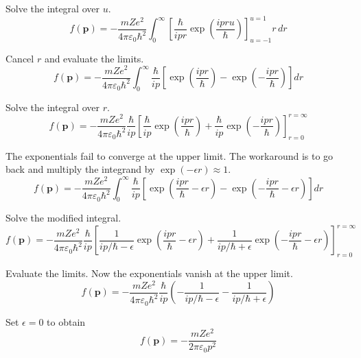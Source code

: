 Solve the integral over $u$.
\begin{equation*}
f(\mathbf p)=-\frac{mZe^2}{4\pi\varepsilon_0\hbar^2}
\int_0^\infty
\left[\frac{\hbar}{ipr}\exp\left(\frac{ipru}{\hbar}\right)\right]_{u=-1}^{u=1}
r\,dr
\end{equation*}

Cancel $r$ and evaluate the limits.
\begin{equation*}
f(\mathbf p)=-\frac{mZe^2}{4\pi\varepsilon_0\hbar^2}
\int_0^\infty
\frac{\hbar}{ip}
\left[\exp\left(\frac{ipr}{\hbar}\right)-\exp\left(-\frac{ipr}{\hbar}\right)\right]
dr
\end{equation*}

Solve the integral over $r$.
\begin{equation*}
f(\mathbf p)
=-\frac{mZe^2}{4\pi\varepsilon_0\hbar^2}\frac{\hbar}{ip}
\left[
\frac{\hbar}{ip}
\exp\left(\frac{ipr}{\hbar}\right)
+\frac{\hbar}{ip}
\exp\left(-\frac{ipr}{\hbar}\right)
\right]_{r=0}^{r=\infty}
\end{equation*}

The exponentials fail to converge at the upper limit.
The workaround is to go back and multiply the integrand by $\exp(-\epsilon r)\approx1$.
\begin{equation*}
f(\mathbf p)=-\frac{mZe^2}{4\pi\varepsilon_0\hbar^2}
\int_0^\infty
\frac{\hbar}{ip}
\left[\exp\left(\frac{ipr}{\hbar}-\epsilon r\right)
-\exp\left(-\frac{ipr}{\hbar}-\epsilon r\right)\right]
dr
\end{equation*}

Solve the modified integral.
\begin{equation*}
f(\mathbf p)=-\frac{mZe^2}{4\pi\varepsilon_0\hbar^2}
\frac{\hbar}{ip}
\left[
\frac{1}{ip/\hbar-\epsilon}\exp\left(\frac{ipr}{\hbar}-\epsilon r\right)
+\frac{1}{ip/\hbar+\epsilon}\exp\left(-\frac{ipr}{\hbar}-\epsilon r\right)
\right]_{r=0}^{r=\infty}
\end{equation*}

Evaluate the limits. Now the exponentials vanish at the upper limit.
\begin{equation*}
f(\mathbf p)=-\frac{mZe^2}{4\pi\varepsilon_0\hbar^2}
\frac{\hbar}{ip}
\left(-\frac{1}{ip/\hbar-\epsilon}-\frac{1}{ip/\hbar+\epsilon}\right)
\tag{1}
\end{equation*}

Set $\epsilon=0$ to obtain
\begin{equation*}
f(\mathbf p)=-\frac{mZe^2}{2\pi\varepsilon_0p^2}
\end{equation*}

